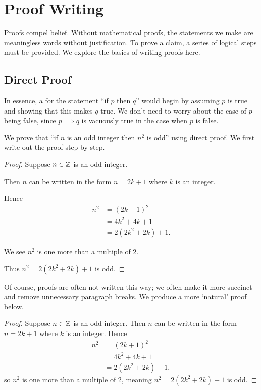 \chapter{Proof Writing}
Proofs compel belief. Without mathematical proofs, the statements we make are meaningless words without justification. To prove a claim, a series of logical steps must be provided. We explore the basics of writing proofs here.

\section{Direct Proof}
In essence, a  for the statement ``if $p$ then $q$'' would begin by assuming $p$ is true and showing that this makes $q$ true. We don't need to worry about the case of $p$ being false, since $p \implies q$ is vacuously true in the case when $p$ is false.
\begin{example}
    We prove that ``if $n$ is an odd integer then $n^2$ is odd'' using direct proof. We first write out the proof step-by-step.
    \begin{proof}
        Suppose $n\in\mathbb{Z}$ is an odd integer.

        Then $n$ can be written in the form $n = 2k + 1$ where $k$ is an integer.

        Hence
        \begin{align*}
            n^2 &= (2k+1)^2\\
            &= 4k^2 + 4k + 1\\
            &= 2(2k^2 + 2k) + 1.
        \end{align*}

        We see $n^2$ is one more than a multiple of 2.

        Thus $n^2 = 2(2k^2 + 2k) + 1$ is odd.
    \end{proof}

    Of course, proofs are often not written this way; we often make it more succinct and remove unnecessary paragraph breaks. We produce a more `natural' proof below.
    \begin{proof}
        Suppose $n\in\mathbb{Z}$ is an odd integer. Then $n$ can be written in the form $n = 2k + 1$ where $k$ is an integer. Hence
        \begin{align*}
            n^2 &= (2k+1)^2\\
            &= 4k^2 + 4k + 1\\
            &= 2(2k^2 + 2k) + 1,
        \end{align*}
        so $n^2$ is one more than a multiple of 2, meaning $n^2 = 2(2k^2 + 2k) + 1$ is odd.
    \end{proof}
\end{example}

